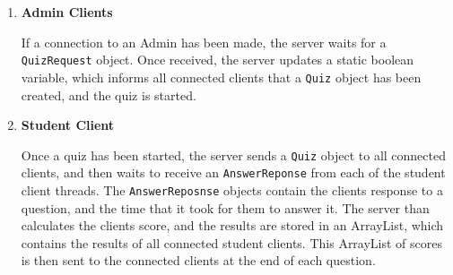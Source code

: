 \begin{enumerate}
	\item \textbf{Admin Clients}

	If a connection to an Admin has been made, the server waits for a
	\texttt{QuizRequest} object. Once received, the server updates a static
	boolean variable, which informs all connected clients that a \texttt{Quiz}
	object has been created, and the quiz is started.

	\item \textbf{Student Client}

	Once a quiz has been started, the server sends a \texttt{Quiz} object to
	all connected clients, and then waits to receive an \texttt{AnswerReponse}
	from each of the student client threads. The \texttt{AnswerReposnse}
	objects contain the clients response to a question, and the time that it
	took for them to answer it.  The server than calculates the clients score,
	and the results are stored in an ArrayList, which contains the results of
	all connected student clients.  This ArrayList of scores is then sent to
	the connected clients at the end of each question.

\end{enumerate}
